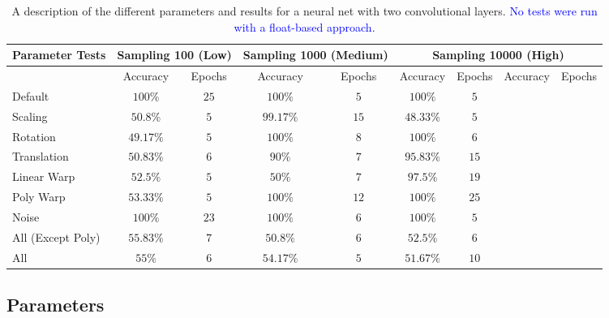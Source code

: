 \documentclass{article}
\begin{document}
\begin{table}[t]
\vskip 0.15in
\begin{center}
\begin{small}
\begin{sc}
\begin{tabular}{lcc|cc|cccr}
\hline
\abovespace\belowspace
Parameter Tests         & \multicolumn{2}{c}{Sampling 100 (Low)} & \multicolumn{2}{c}{Sampling 1000 (Medium)} & \multicolumn{4}{c}{Sampling 10000 (High)} \\
\hline
                        & Accuracy  & Epochs   & Accuracy  & Epochs   & Accuracy  & Epochs   & Accuracy  & Epochs\\
\hline
\abovespace
Default                 & $100\%$   & $25$     & $100\%$    & $5$    & $100\%$   & $5$  &    & \\
Scaling                 & $50.8\%$  & $5$      & $99.17\%$  & $15$   & $48.33\%$ & $5$  &    & \\
Rotation                & $49.17\%$ & $5$      & $100\%$    & $8$    & $100\%$   & $6$  &    & \\
Translation             & $50.83\%$ & $6$      & $90\%$     & $7$    & $95.83\%$ & $15$ &    & \\
Linear Warp             & $52.5\%$  & $5$      & $50\%$     & $7$    & $97.5\%$  & $19$ &    & \\
Poly Warp               & $53.33\%$ & $5$      & $100\%$    & $12$   & $100\%$   & $25$ &    & \\
Noise                   & $100\%$   & $23$     & $100\%$    & $6$    & $100\%$   & $5$  &    & \\
All (Except Poly)       & $55.83\%$ & $7$      & $50.8\%$   & $6$    & $52.5\%$  & $6$  &    & \\
All                     & $55\%$    & $6$      & $54.17\%$  & $5$    & $51.67\%$ & $10$ &    & \\
\end{tabular}
\end{sc}
\end{small}
\end{center}
\vskip -0.1in
\caption{A description of the different parameters and results for a neural net with two convolutional layers. \textcolor{blue}{No tests were run with a float-based approach.}}
\label{table:results2}
\end{table}

\subsection{Parameters}
\end{document}
